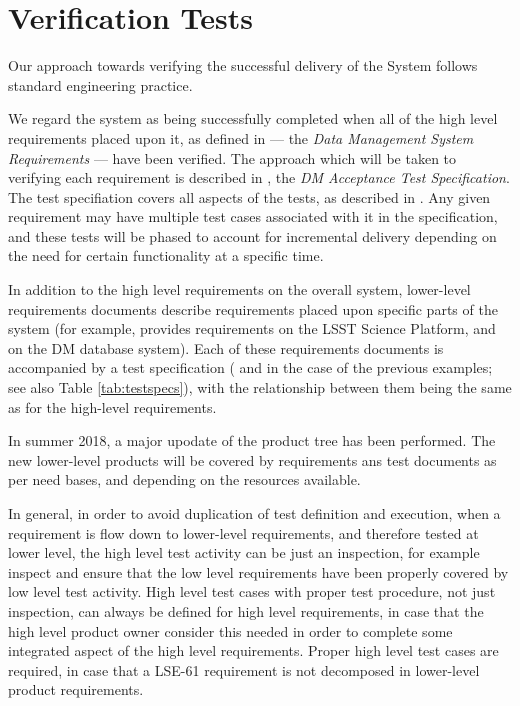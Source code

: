 \section{Verification Tests \label{sect:approach}}

Our approach towards verifying the successful delivery of the \product{} System follows standard engineering practice.

We regard the system as being successfully completed when all of the high level requirements placed upon it, as defined in  --- the \emph{Data Management System Requirements} --- have been verified.
The approach which will be taken to verifying each requirement is described in , the \emph{DM Acceptance Test Specification}.
The test specifiation covers all aspects of the tests, as described in .
Any given requirement may have multiple test cases associated with it in the specification, and these tests will be phased to account for incremental delivery depending on the need for certain functionality at a specific time.

In addition to the high level requirements on the overall \product{} system, lower-level requirements documents describe requirements placed upon specific parts of the system (for example,  provides requirements on the LSST Science Platform, and  on the DM database system).
Each of these requirements documents is accompanied by a test specification ( and  in the case of the previous examples; see also Table \ref{tab:testspecs}), with the relationship between them being the same as for the high-level requirements.

In summer 2018, a major upodate of the \product{} product tree has been performed. The new lower-level products will be covered by requirements ans test documents as per need bases, and depending on the resources available.

In general, in order to avoid duplication of test definition and execution, when a requirement is flow down to lower-level requirements, and therefore tested at lower level, the high level test activity can be just an inspection, for example inspect and ensure that the low level requirements have been properly covered by low level test activity.
High level test cases with proper test procedure, not just inspection, can always be defined for high level requirements, in case that the high level product owner consider this needed in order to complete some integrated aspect of the high level requirements.
Proper high level test cases are required, in case that a LSE-61 requirement is not decomposed in lower-level product requirements.

